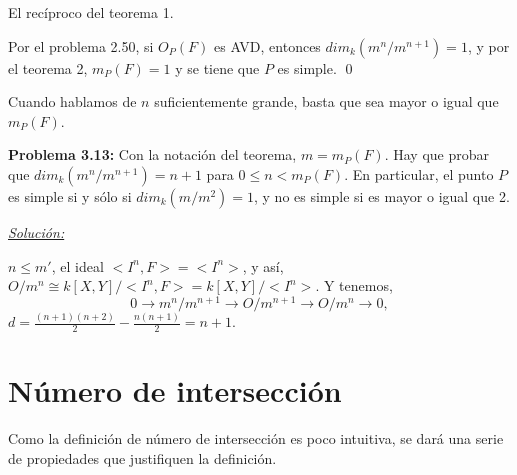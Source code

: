 \begin{Cor}
El recíproco del teorema 1.
\end{Cor}

\begin{Dem}
Por el problema 2.50, si $O_P(F)$ es AVD, entonces $dim_k(m^n/m^{n+1})=1$, y por el teorema 2, $m_P(F)=1$ y se tiene que $P$ es simple. \qed
\end{Dem}

\begin{nota}
Cuando hablamos de $n$ suficientemente grande, basta que sea mayor o igual que $m_P(F)$.
\end{nota}

\textbf{Problema 3.13: } Con la notación del teorema, $m=m_P(F)$. Hay que probar que $dim_k(m^n/m^{n+1})=n+1$ para $0\le n <m_P(F)$. En particular, el punto $P$ es simple si y sólo si $dim_k(m/m^2)=1$, y no es simple si es mayor o igual que 2. 

\underline{\textit{Solución:}}

$n\le m'$, el ideal $<I^n,F>=<I^n>$, y así, $O/m^n \cong k[X,Y]/<I^n,F> =k[X,Y]/<I^n>$. Y tenemos,
$$0 \rightarrow m^n/m^{n+1} \rightarrow O/m^{n+1} \rightarrow O/m^{n} \rightarrow 0, $$
$d=\frac{(n+1)(n+2)}{2}-\frac{n(n+1)}{2}=n+1$.


\section{Número de intersección}

Como la definición de número de intersección es poco intuitiva, se dará una serie de propiedades que justifiquen la definición. 

